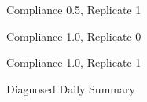 \documentclass[11pt]{article}
\begin{document}
 \begin{figure}[h]
\caption{Compliance 0.5, Replicate 1}
\label{fig:indemics}
\end{figure}

 \begin{figure}[h]
\caption{Compliance 1.0, Replicate 0}
\label{fig:indemics}
\end{figure}

 \begin{figure}[h]
\caption{Compliance 1.0, Replicate 1}
\label{fig:indemics}
\end{figure}

 \begin{figure}[h]
\caption{Diagnosed Daily Summary}
\label{fig:indemics}
\end{figure}
\end{document}
